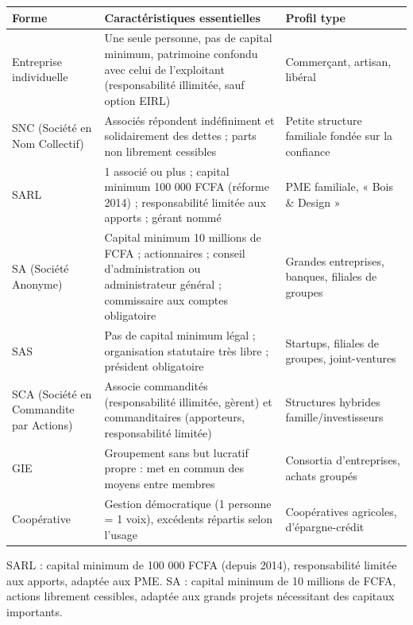 \documentclass[11pt]{article}
\newcommand{\cle}[1]{{\popxbold\color{popdark}#1}}
\begin{document}
\begin{center}
\begin{tabularx}{\linewidth}{|l|X|X|}
\hline
\rowcolor{popblueL} \textbf{Forme} & \textbf{Caractéristiques essentielles} & \textbf{Profil type} \\
\hline
Entreprise individuelle & Une seule personne, pas de capital minimum, patrimoine confondu avec celui de l'exploitant (responsabilité illimitée, sauf option EIRL) & Commerçant, artisan, libéral \\
\hline
SNC (Société en Nom Collectif) & Associés répondent indéfiniment et solidairement des dettes ; parts non librement cessibles & Petite structure familiale fondée sur la confiance \\
\hline
SARL & 1 associé ou plus ; capital minimum 100 000 FCFA (réforme 2014) ; responsabilité limitée aux apports ; gérant nommé & PME familiale, « Bois \& Design » \\
\hline
SA (Société Anonyme) & Capital minimum 10 millions de FCFA ; actionnaires ; conseil d'administration ou administrateur général ; commissaire aux comptes obligatoire & Grandes entreprises, banques, filiales de groupes \\
\hline
SAS & Pas de capital minimum légal ; organisation statutaire très libre ; président obligatoire & Startups, filiales de groupes, joint-ventures \\
\hline
SCA (Société en Commandite par Actions) & Associe commandités (responsabilité illimitée, gèrent) et commanditaires (apporteurs, responsabilité limitée) & Structures hybrides famille/investisseurs \\
\hline
GIE & Groupement sans but lucratif propre : met en commun des moyens entre membres & Consortia d'entreprises, achats groupés \\
\hline
Coopérative & Gestion démocratique (1 personne = 1 voix), excédents répartis selon l'usage & Coopératives agricoles, d'épargne-crédit \\
\hline
\end{tabularx}
\end{center}

\begin{aretenir}
\cle{SARL} : capital minimum de 100 000 FCFA (depuis 2014), responsabilité limitée aux apports, adaptée aux PME. \cle{SA} : capital minimum de 10 millions de FCFA, actions librement cessibles, adaptée aux grands projets nécessitant des capitaux importants.
\end{aretenir}
\end{document}
